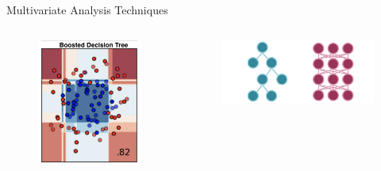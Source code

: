 \documentclass[aspectratio=169,xcolor=table]{beamer}
\begin{document}
\begin{frame}[t]{Multivariate Analysis Techniques}
      \begin{columns}
        \begin{figure}
          \begin{columns}
          \centering
          \includegraphics[height=.35\textheight,keepaspectratio=true]{BDT_Example.png}
          \caption{\tiny \cite{scikit}}
          \end{columns}
        \end{figure}

      \begin{figure}
        \begin{columns}
        \centering
        \includegraphics[width=\textwidth,keepaspectratio=true]{BDT_vs_PNN_Diagram.png}
        \caption{\tiny \cite{BDT-vs-PNN}}
        \end{columns}
      \end{figure}


\end{columns}
\end{frame}
\end{document}
